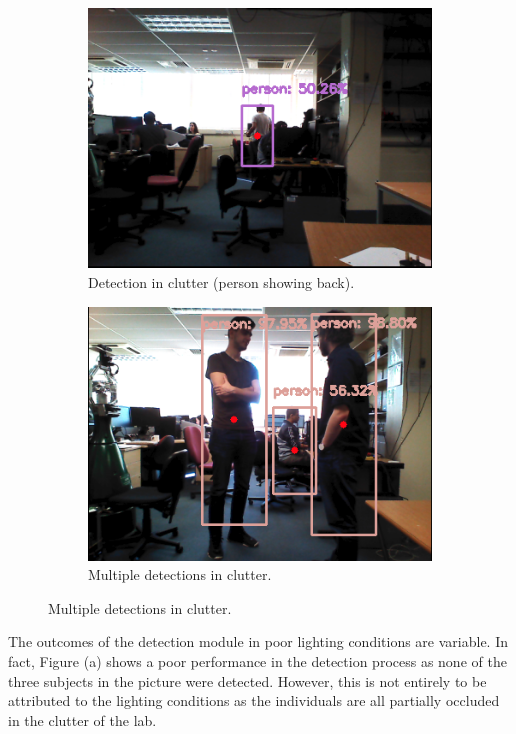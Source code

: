 \begin{figure}[H]
\begin{subfigure}{.5\textwidth}
        \includegraphics[width=.9\linewidth]{images/chapter6_clutter_light_detection_back.png}
        \caption{Detection in clutter (person showing back).}
	\end{subfigure}
    \begin{subfigure}{.5\textwidth}
        \centering
        \includegraphics[width=.9\linewidth]{images/chapter6_clutter_standing.png}
        \caption{Multiple detections in clutter.}
	\end{subfigure}
\end{figure}

The outcomes of the detection module in poor lighting conditions are variable. In fact, Figure (a) shows a poor performance in the detection process as none of the three subjects in the picture were detected. However, this is not entirely to be attributed to the lighting conditions as the individuals are all partially occluded in the clutter of the lab.

